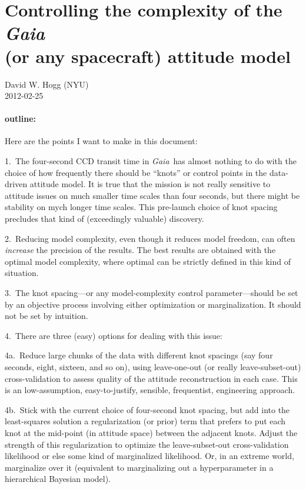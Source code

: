 \documentclass[12pt]{article}
\newcommand{\project}[1]{\textsl{#1}}
\newcommand{\gaia}{\project{Gaia}}
\begin{document}
\sloppy\sloppypar\raggedbottom

\section*{Controlling the complexity of the \gaia \\
          (or any spacecraft) attitude model}

\noindent
David W. Hogg (NYU) \\
2012-02-25

\paragraph{outline:}
Here are the points I want to make in this document:

1.~The four-second CCD transit time in \gaia\ has almost nothing to do
with the choice of how frequently there should be ``knots'' or control
points in the data-driven attitude model.  It is true that the mission
is not really sensitive to attitude issues on much smaller time scales
than four seconds, but there might be stability on mych longer time
scales.  This pre-launch choice of knot spacing precludes that kind of
(exceedingly valuable) discovery.

2.~Reducing model complexity, even though it reduces model freedom,
can often \emph{increase} the precision of the results.  The best
results are obtained with the optimal model complexity, where optimal
can be strictly defined in this kind of situation.

3.~The knot spacing---or any model-complexity control
parameter---should be set by an objective process involving either
optimization or marginalization.  It should not be set by intuition.

4.~There are three (easy) options for dealing with this issue:

4a.~Reduce large chunks of the data with different knot spacings (say
four seconds, eight, sixteen, and so on), using leave-one-out (or
really leave-subset-out) cross-validation to assess quality of the
attitude reconstruction in each case.  This is an low-assumption,
easy-to-justify, sensible, frequentist, engineering approach.

4b.~Stick with the current choice of four-second knot spacing, but add
into the least-squares solution a regularization (or prior) term that
prefers to put each knot at the mid-point (in attitude space) between
the adjacent knots.  Adjust the strength of this regularization to
optimize the leave-subset-out cross-validation likelihood or else some
kind of marginalized likelihood.  Or, in an extreme world, marginalize
over it (equivalent to marginalizing out a hyperparameter in a
hierarchical Bayesian model).
\end{document}
